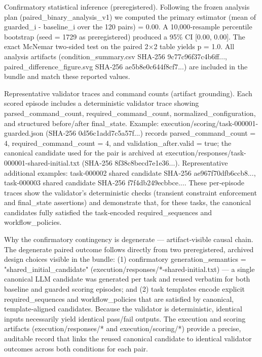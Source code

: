 \documentclass[conference]{IEEEtran}
\begin{document}
Confirmatory statistical inference (preregistered). Following the frozen analysis plan (paired\_binary\_analysis\_v1) we computed the primary estimator (mean of guarded\_i - baseline\_i over the 120 pairs) = 0.00. A 10,000‑resample percentile bootstrap (seed = 1729 as preregistered) produced a 95\% CI [0.00, 0.00]. The exact McNemar two‑sided test on the paired 2\ensuremath{\times}2 table yields p = 1.0. All analysis artifacts (condition\_summary.csv SHA‑256 9c77c96f37c4b6ff..., paired\_difference\_figure.svg SHA‑256 ae5b8e0c644f8cf7...) are included in the bundle and match these reported values.

Representative validator traces and command counts (artifact grounding). Each scored episode includes a deterministic validator trace showing parsed\_command\_count, required\_command\_count, normalized\_configuration, and structured before/after final\_state. Example: execution/scoring/task-000001-guarded.json (SHA‑256 0d56c1add7c5a57f...) records parsed\_command\_count = 4, required\_command\_count = 4, and validation\_after.valid = true; the canonical candidate used for the pair is archived at execution/responses/task-000001-shared-initial.txt (SHA‑256 8f38c8becd7e1e36...). Representative additional examples: task‑000002 shared candidate SHA‑256 ae967f70dfb6ccb8..., task‑000003 shared candidate SHA‑256 f7f4db249ecbbce.... These per‑episode traces show the validator's deterministic checks (transient constraint enforcement and final\_state assertions) and demonstrate that, for these tasks, the canonical candidates fully satisfied the task‑encoded required\_sequences and workflow\_policies.

Why the confirmatory contingency is degenerate --- artifact‑visible causal chain. The degenerate paired outcome follows directly from two preregistered, archived design choices visible in the bundle: (1) confirmatory generation\_semantics = "shared\_initial\_candidate" (execution/responses/*-shared-initial.txt) --- a single canonical LLM candidate was generated per task and reused verbatim for both baseline and guarded scoring episodes; and (2) task templates encode explicit required\_sequences and workflow\_policies that are satisfied by canonical, template‑aligned candidates. Because the validator is deterministic, identical inputs necessarily yield identical pass/fail outputs. The execution and scoring artifacts (execution/responses/* and execution/scoring/*) provide a precise, auditable record that links the reused canonical candidate to identical validator outcomes across both conditions for each pair.
\end{document}
